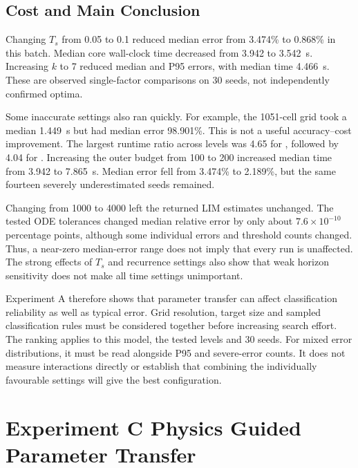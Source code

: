\subsection{Cost and Main Conclusion}
\begin{revision}
Changing $T_s$ from 0.05 to 0.1 reduced median error from 3.474\% to 0.868\% in this batch. Median core wall-clock time decreased from 3.942 to 3.542~s. Increasing $k$ to 7 reduced median and P95 errors, with median time 4.466~s. These are observed single-factor comparisons on 30 seeds, not independently confirmed optima.

Some inaccurate settings also ran quickly. For example, the 1051-cell grid took a median 1.449~s but had median error 98.901\%. This is not a useful accuracy--cost improvement. The largest runtime ratio across levels was 4.65 for , followed by 4.04 for . Increasing the outer budget from 100 to 200 increased median time from 3.942 to 7.865~s. Median error fell from 3.474\% to 2.189\%, but the same fourteen severely underestimated seeds remained.

Changing  from 1000 to 4000 left the returned LIM estimates unchanged. The tested ODE tolerances changed median relative error by only about $7.6\times10^{-10}$ percentage points, although some individual errors and threshold counts changed. Thus, a near-zero median-error range does not imply that every run is unaffected. The strong effects of $T_s$ and recurrence settings also show that weak horizon sensitivity does not make all time settings unimportant.

Experiment A therefore shows that parameter transfer can affect classification reliability as well as typical error. Grid resolution, target size and sampled classification rules must be considered together before increasing search effort. The ranking applies to this model, the tested levels and 30 seeds. For mixed error distributions, it must be read alongside P95 and severe-error counts. It does not measure interactions directly or establish that combining the individually favourable settings will give the best configuration.
\end{revision}



\section{Experiment C Physics Guided Parameter Transfer}
\label{sec:experiment-c}

